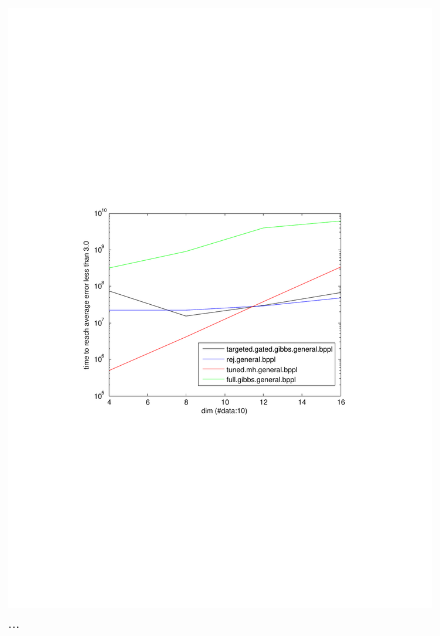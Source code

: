 \begin{figure}%
\centering
\includegraphics[width=1.2\textwidth]{pic1/dimAnalysisData10.pdf}
\caption{...}
\label{fig:pref}
\end{figure}

